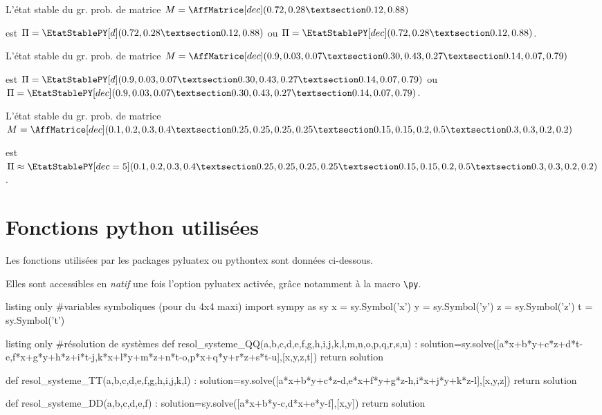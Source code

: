 \documentclass[french,a4paper,11pt]{article}
\begin{document}
\begin{PresentationCode}{}
L'état stable du gr. prob. de matrice
$M=\AffMatrice[dec](0.72,0.28 § 0.12,0.88)$

est $\Pi = \EtatStablePY[d](0.72,0.28 § 0.12,0.88)$
ou $\Pi = \EtatStablePY[dec](0.72,0.28 § 0.12,0.88)$.
\end{PresentationCode}

\begin{PresentationCode}{}
L'état stable du gr. prob. de matrice
$M=\AffMatrice[dec](0.9,0.03,0.07 § 0.30,0.43,0.27 § 0.14,0.07,0.79)$

est $\Pi = \EtatStablePY[d](0.9,0.03,0.07 § 0.30,0.43,0.27 § 0.14,0.07,0.79)$
ou $\Pi = \EtatStablePY[dec](0.9,0.03,0.07 § 0.30,0.43,0.27 § 0.14,0.07,0.79)$.
\end{PresentationCode}

\begin{PresentationCode}{}
L'état stable du gr. prob. de matrice
$M=\AffMatrice[dec]%
	(0.1,0.2,0.3,0.4 § 0.25,0.25,0.25,0.25 § 0.15,0.15,0.2,0.5 § 0.3,0.3,0.2,0.2)$

est $\Pi \approx
\EtatStablePY[dec=5]%
(0.1,0.2,0.3,0.4 § 0.25,0.25,0.25,0.25 § 0.15,0.15,0.2,0.5 § 0.3,0.3,0.2,0.2)$.
\end{PresentationCode}


\pagebreak

\part{Fonctions python utilisées}

\begin{cautionblock}
Les fonctions utilisées par les packages \textsf{pyluatex} ou \textsf{pythontex} sont données ci-dessous.

Elles sont accessibles en \textit{natif} une fois l'option \textsf{pyluatex} activée, grâce notamment à la macro \texttt{\textbackslash py}.
\end{cautionblock}

\begin{PresentationCodePython}{listing only}
#variables symboliques (pour du 4x4 maxi)
import sympy as sy
x = sy.Symbol('x')
y = sy.Symbol('y')
z = sy.Symbol('z')
t = sy.Symbol('t')
\end{PresentationCodePython}

\begin{PresentationCodePython}{listing only}
#résolution de systèmes
def resol_systeme_QQ(a,b,c,d,e,f,g,h,i,j,k,l,m,n,o,p,q,r,s,u) :
	solution=sy.solve([a*x+b*y+c*z+d*t-e,f*x+g*y+h*z+i*t-j,k*x+l*y+m*z+n*t-o,p*x+q*y+r*z+s*t-u],[x,y,z,t])
	return solution

def resol_systeme_TT(a,b,c,d,e,f,g,h,i,j,k,l) :
	solution=sy.solve([a*x+b*y+c*z-d,e*x+f*y+g*z-h,i*x+j*y+k*z-l],[x,y,z])
	return solution

def resol_systeme_DD(a,b,c,d,e,f) :
	solution=sy.solve([a*x+b*y-c,d*x+e*y-f],[x,y])
	return solution
\end{PresentationCodePython}
\end{document}
